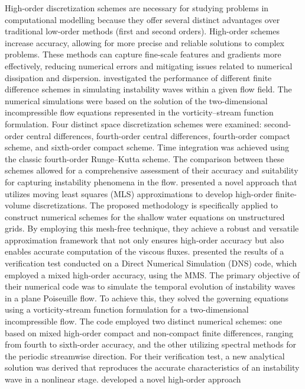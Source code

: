 \documentclass[preprint, 12pt]{elsarticle}
\begin{document}
High-order discretization schemes are necessary for studying problems in
computational modelling because they offer several distinct advantages over
traditional low-order methods (first and second orders). High-order schemes
increase accuracy, allowing for more precise and reliable solutions to complex
problems. These methods can capture fine-scale features and gradients more
effectively, reducing numerical errors and mitigating issues related to
numerical dissipation and dispersion. \citet{Souza2005} investigated the
performance of different finite difference schemes in simulating instability
waves within a given flow field. The numerical simulations were based on the
solution of the two-dimensional incompressible flow equations represented in
the vorticity–stream function formulation. Four distinct space discretization
schemes were examined: second-order central differences, fourth-order central
differences, fourth-order compact scheme, and sixth-order compact scheme. Time
integration was achieved using the classic fourth-order Runge–Kutta scheme. The
comparison between these schemes allowed for a comprehensive assessment of
their accuracy and suitability for capturing instability phenomena in the flow.
\citet{Cueto2006} presented a novel approach that utilizes moving least squares
(MLS) approximations to develop high-order finite-volume discretizations. The
proposed methodology is specifically applied to construct numerical schemes for
the shallow water equations on unstructured grids. By employing this mesh-free
technique, they achieve a robust and versatile approximation framework that not
only ensures high-order accuracy but also enables accurate computation of the
viscous fluxes. \citet{Silva2010} presented the results of a verification test
conducted on a Direct Numerical Simulation (DNS) code, which employed a mixed
high-order accuracy, using the MMS. The primary objective of their numerical
code was to simulate the temporal evolution of instability waves in a plane
Poiseuille flow. To achieve this, they solved the governing equations using a
vorticity-stream function formulation for a two-dimensional incompressible
flow. The code employed two distinct numerical schemes: one based on mixed
high-order compact and non-compact finite differences, ranging from fourth to
sixth-order accuracy, and the other utilizing spectral methods for the periodic
streamwise direction. For their verification test, a new analytical solution
was derived that reproduces the accurate characteristics of an instability wave
in a nonlinear stage. \citet{Fadel2011} developed a novel high-order approach
\end{document}
